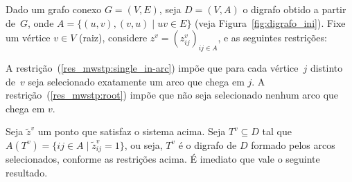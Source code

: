 

Dado um grafo conexo $G = (V,E)$, seja $D = (V,A)$ o digrafo obtido a
partir de~$G$, onde $A = \{(u,v),(v,u)\; |\; uv \in E\}$
(veja Figura~\ref{fig:digrafo_ini}).
Fixe um vértice
$v \in V$ (raiz),  considere $z^{v} = (z_{ij}^{v})_{ij \in A}$, e as seguintes
restrições:

\begin{lpformulation}[]
\end{lpformulation}

A restrição~(\ref{res_mwstp:single_in-arc}) impõe que para cada
vértice~$j$ distinto de~$v$ seja selecionado exatamente um arco 
que chega em $j$. A restrição~(\ref{res_mwstp:root}) impõe que não
seja selecionado nenhum arco que chega em $v$.

Seja $\tilde{z}^{v}$ um ponto que satisfaz o sistema acima. Seja
$T^{v} \subseteq D$ tal que $A(T^{v}) = \{ij \in A\; |\; \tilde{z}^{v}_{ij} = 1\}$,
ou seja, $T^{v}$ é o digrafo de $D$ formado pelos arcos selecionados,
conforme as restrições acima. É imediato que vale o seguinte resultado.


